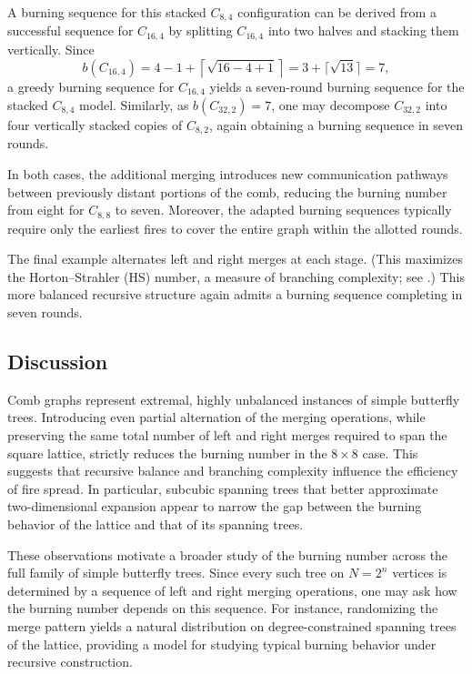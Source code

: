 \documentclass{article}
\begin{document}
A burning sequence for this stacked $C_{8,4}$ configuration can be derived from a successful sequence for $C_{16,4}$ by splitting $C_{16,4}$ into two halves and stacking them vertically. Since
\[
b(C_{16,4}) = 4 - 1 + \left\lceil \sqrt{16 - 4 + 1} \right\rceil
= 3 + \lceil \sqrt{13} \rceil = 7,
\]
a greedy burning sequence for $C_{16,4}$ yields a seven-round burning sequence for the stacked $C_{8,4}$ model. Similarly, as $b(C_{32,2}) = 7$, one may decompose $C_{32,2}$ into four vertically stacked copies of $C_{8,2}$, again obtaining a burning sequence in seven rounds.

In both cases, the additional merging introduces new communication pathways between previously distant portions of the comb, reducing the burning number from eight for $C_{8,8}$ to seven. Moreover, the adapted burning sequences typically require only the earliest fires to cover the entire graph within the allotted rounds.

The final example alternates left and right merges at each stage. (This maximizes the Horton–Strahler (HS) number, a measure of branching complexity; see \cite{peca2025horton}.) This more balanced recursive structure again admits a burning sequence completing in seven rounds.

\subsection{Discussion}

Comb graphs represent extremal, highly unbalanced instances of simple butterfly trees. Introducing even partial alternation of the merging operations, while preserving the same total number of left and right merges required to span the square lattice, strictly reduces the burning number in the $8 \times 8$ case. This suggests that recursive balance and branching complexity influence the efficiency of fire spread. In particular, subcubic spanning trees that better approximate two-dimensional expansion appear to narrow the gap between the burning behavior of the lattice and that of its spanning trees.

These observations motivate a broader study of the burning number across the full family of simple butterfly trees. Since every such tree on $N = 2^n$ vertices is determined by a sequence of left and right merging operations, one may ask how the burning number depends on this sequence. For instance, randomizing the merge pattern yields a natural distribution on degree-constrained spanning trees of the lattice, providing a model for studying typical burning behavior under recursive construction.
\end{document}
